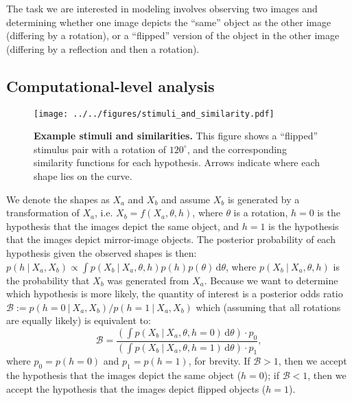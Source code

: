 \documentclass[10pt,letterpaper]{article}
\newcommand{\hi}[0]{h=0}
\newcommand{\hf}[0]{h=1}
\newcommand{\dif}[0]{\,\mathrm{d}}
\begin{document}
The task we are interested in modeling involves observing two images
and determining whether one image depicts the ``same'' object as the
other image (differing by a rotation), or a ``flipped'' version of the
object in the other image (differing by a reflection and then a
rotation).

\subsection{Computational-level analysis}

\begin{figure}[t]
  \begin{center}
    \texttt{[image: ../../figures/stimuli\_and\_similarity.pdf]}
    \caption{\textbf{Example stimuli and similarities.} This figure
      shows a ``flipped'' stimulus pair with a rotation of
      $120^\circ$, and the corresponding similarity functions for each
      hypothesis. Arrows indicate where each shape lies on the curve.}
    \label{fig:shapes}
  \end{center}
\end{figure}

We denote the shapes as $X_a$ and $X_b$ and assume $X_b$ is generated
by a transformation of $X_a$, i.e. $X_b=f(X_a, \theta, h)$, where
$\theta$ is a rotation, $\hi$ is the hypothesis that the images depict
the same object, and $\hf$ is the hypothesis that the images depict
mirror-image objects. The posterior probability of each hypothesis
given the observed shapes is then:
$p(h\ \vert\ X_a, X_b) \propto \int p(X_b\ \vert\ X_a, \theta,
h)p(h)p(\theta)\dif\theta$,
where $p(X_b\ \vert\ X_a, \theta, h)$ is the probability that $X_b$
was generated from $X_a$. Because we want to determine which
hypothesis is more likely, the quantity of interest is a posterior
odds ratio
$\mathcal{B}:=p(\hi\ \vert\ X_a, X_b) / p(\hf\ \vert\ X_a, X_b)$ which
(assuming that all rotations are equally likely) is equivalent to:
\begin{equation}
  \mathcal{B} = \frac{\left(\int p(X_b\ \vert\ X_a, \theta, \hi)\dif\theta\right)\cdot{}p_0}{\left(\int p(X_b\ \vert\ X_a, \theta, \hf)\dif\theta\right)\cdot{}p_1},
  \label{eq:odds-ratio}
\end{equation}
where $p_0=p(h=0)$ and $p_1=p(h=1)$, for brevity. If $\mathcal{B} > 1$, then
we accept the hypothesis that the images depict the same object
($\hi$); if $\mathcal{B} < 1$, then we accept the hypothesis that the images
depict flipped objects ($\hf$).
\end{document}
